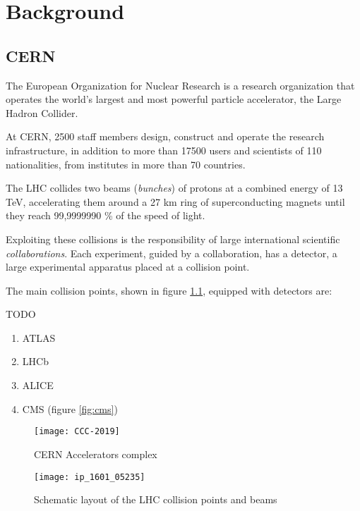 \chapter{Background}

\section{CERN}

The European Organization for Nuclear Research is a research organization that operates the world’s largest and most powerful particle accelerator, the Large Hadron Collider.

At CERN, 2500 staff members design, construct and operate the research infrastructure, in addition to more than 17500 users and scientists of 110 nationalities, from institutes in more than 70 countries.

The LHC collides two beams (\textit{bunches}) of protons at a combined energy of 13 TeV, accelerating them around a 27 km ring of superconducting magnets until they reach 99,9999990 \% of the speed of light.


Exploiting these collisions is the responsibility of large international scientific \textit{collaborations}. Each experiment, guided by a collaboration, has a detector, a large experimental apparatus placed at a collision point.

The main collision points, shown in figure \ref{fig:cern_complex}, equipped with detectors are:

TODO

\begin{enumerate}
	\item ATLAS
	\item LHCb
	\item ALICE
	\item CMS (figure \ref{fig:cms})
\end{enumerate}

\begin{figure}
	\centerline{
		\texttt{[image: CCC-2019]}}
	\caption{CERN Accelerators complex \cite{Mobs:2684277}}
	\label{fig:cern_complex}
\end{figure}

\begin{figure}
	\centerline{
		\texttt{[image: ip\_1601\_05235]}}
	\caption{Schematic layout of the LHC collision points and beams \cite{Herr:1982430}}
	\label{fig:ip}
\end{figure}



